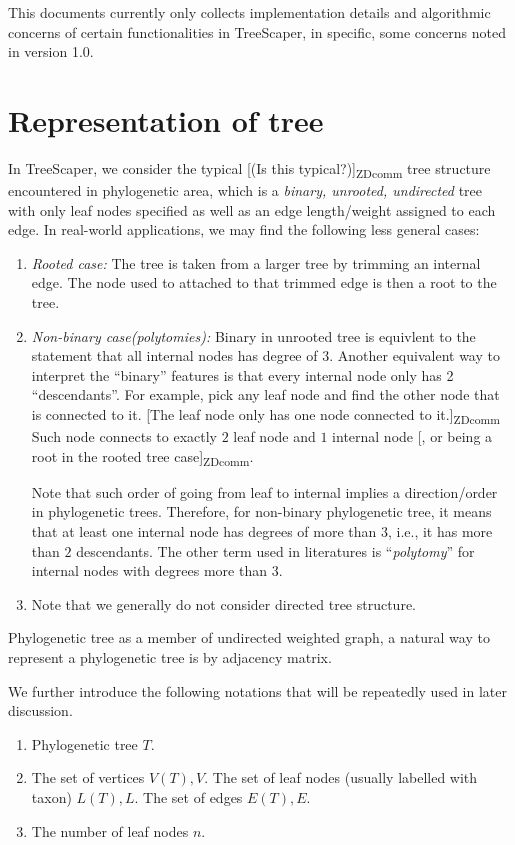 \documentclass[11pt]{article}
\theoremstyle{definition}
\theoremstyle{remark}
\theoremstyle{plain}
\newcommand{\zdcomm}[1]{ {\color{blue} [#1]\textsubscript{ZDcomm}}}
\begin{document}
\begin{center}\tableofcontents\end{center}
\newpage

This documents currently only collects implementation details and algorithmic concerns of certain functionalities in TreeScaper, in specific, some concerns noted in version 1.0.


\section{Representation of tree}

In TreeScaper, we consider the typical \zdcomm{(Is this typical?)} tree structure encountered in phylogenetic area, which is a \emph{binary, unrooted, undirected} tree with only leaf nodes specified as well as an edge length/weight assigned to each edge. In real-world applications, we may find the following less general cases:
\begin{enumerate}
	\item \emph{Rooted case:} The tree is taken from a larger tree by trimming an internal edge. The node used to attached to that trimmed edge is then a root to the tree.
	\item \emph{Non-binary case(polytomies):} Binary in unrooted tree is equivlent to the statement that all internal nodes has degree of $3$. Another equivalent way to interpret the ``binary'' features is that every internal node only has 2 ``descendants''. For example, pick any leaf node and find the other node that is connected to it. \zdcomm{The leaf node only has one node connected to it.} Such node connects to exactly $2$ leaf node and $1$ internal node\zdcomm{, or being a root in the rooted tree case}.
	
	Note that such order of going from leaf to internal implies a direction/order in phylogenetic trees. Therefore, for non-binary phylogenetic tree, it means that at least one internal node has degrees of more than $3$, i.e., it has more than $2$ descendants. The other term used in literatures is ``\emph{polytomy}'' for internal nodes with degrees more than $3$.
	\item Note that we generally do not consider directed tree structure.
\end{enumerate}

Phylogenetic tree as a member of undirected weighted graph, a natural way to represent a phylogenetic tree is by adjacency matrix. 

We further introduce the following notations that will be repeatedly used in later discussion.
\begin{enumerate}
	\item Phylogenetic tree $T$.
	\item The set of vertices $V(T), V$. The set of leaf nodes (usually labelled with taxon) $L(T), L$. The set of edges $E(T), E$.
	\item The number of leaf nodes $n$.
\end{enumerate}
\end{document}
